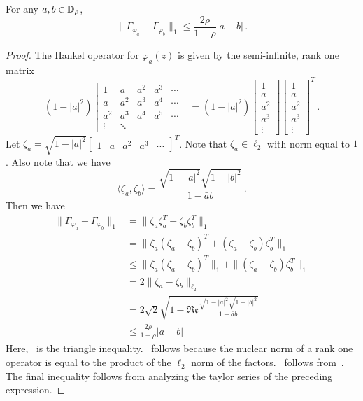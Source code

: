 \begin{lemma} For any $a,b \in \mathbb{D}_\rho$,
\begin{equation}\label{eq:hankel-op-bound}
	\|\Gamma_{\varphi_a}-\Gamma_{\varphi_b}\|_1 \leq \frac{2\rho}{1-\rho} |a-b|\,.
\end{equation}
\end{lemma}
\begin{proof}
	The Hankel operator for $\varphi_a(z)$ is given by the semi-infinite, rank one matrix
	\[
		(1-|a|^2)\left[\begin{array}{ccccc}
			1 & a & a^2 & a^3 & \cdots\\
			a & a^2 & a^3 & a^4 & \cdots\\
			a^2 & a^3 & a^4 & a^5 & \cdots\\
			\vdots & \ddots
		\end{array}\right] = (1-|a|^2) \left[\begin{array}{c} 1 \\ a\\ a^2\\a^3 \\ \vdots \end{array}\right]
		\left[\begin{array}{c} 1 \\ a\\ a^2\\a^3 \\ \vdots \end{array}\right]^T\,.
	\]
Let $\zeta_a = \sqrt{1-|a|^2} \left[\begin{array}{cccccc} 1 & a & a^2 & a^3 & \cdots \end{array}\right]^T$.  Note that $\zeta_a \in \ell_2$ with norm equal to $1$.  Also note that we have
\begin{equation}\label{eq:zeta-dot}
	\langle \zeta_a, \zeta_b \rangle =  \frac{\sqrt{1-|a|^2}\sqrt{1-|b|^2}}{1-\bar{a}b}\,.
\end{equation}
Then we have
\begin{subequations}
\begin{align}
\nonumber	\|\Gamma_{\varphi_a}-\Gamma_{\varphi_b}\|_1 &= \| \zeta_a \zeta_a^T - \zeta_b \zeta_b^T\|_1\\
	& =  \| \zeta_a (\zeta_a-\zeta_b)^T +  (\zeta_a-\zeta_b) \zeta_b^T\|_1\\
	\label{eq:tri-ineq} &\leq \| \zeta_a (\zeta_a-\zeta_b)^T \|_1 + \| (\zeta_a-\zeta_b) \zeta_b^T\|_1\\
	\label{eq:nuc-2-l2} &= 2 \| \zeta_a-\zeta_b\|_{\ell_2}\\
\label{eq:l2-dist-formula}	&=2 \sqrt{2}\sqrt{1 - \mathfrak{Re} \frac{\sqrt{1-|a|^2}\sqrt{1-|b|^2}}{1-\bar{a}b}}\\
	\nonumber&\leq \frac{2 \rho}{1-\rho} |a-b|
\end{align}
\end{subequations}
Here,~  is the triangle inequality.~ follows because the nuclear norm of a rank one operator is equal to the product of the $\ell_2$ norm of the factors.~ follows from~.  The final inequality follows from analyzing the taylor series of the preceding expression.
\end{proof}

